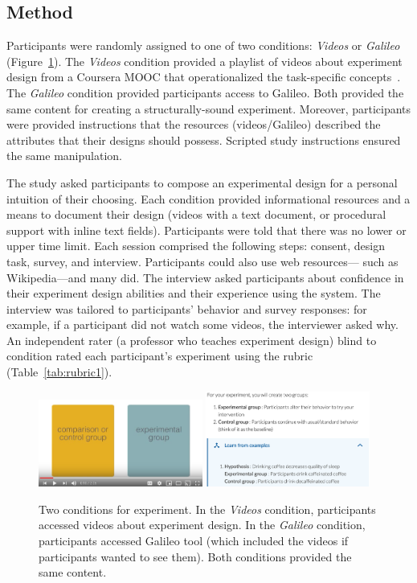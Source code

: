 \subsection*{Method}
Participants were randomly assigned to one of two conditions: \textit{Videos} or \textit{Galileo} (Figure~\ref{fig:galileo-6-study}). The \textit{Videos} condition provided a playlist of videos about experiment design from a Coursera MOOC that operationalized the task-specific concepts~\cite{Wobbrock2018}. The \textit{Galileo} condition provided participants access to Galileo. Both provided the same content for creating a structurally-sound experiment. Moreover, participants were provided instructions that the resources (videos/Galileo) described the attributes that their designs should possess. Scripted study instructions ensured the same manipulation. 

The study asked participants to compose an experimental design for a personal intuition of their choosing. Each condition provided informational resources and a means to document their design (videos with a text document, or procedural support with inline text fields). Participants were told that there was no lower or upper time limit. Each session comprised the following steps: consent, design task, survey, and interview. Participants could also use web resources--- such as Wikipedia---and many did. The interview asked participants about confidence in their experiment design abilities and their experience using the system. The interview was tailored to participants' behavior and survey responses: for example, if a participant did not watch some videos, the interviewer asked why. An independent rater (a professor who teaches experiment design) blind to condition rated each participant's experiment using the rubric (Table~\ref{tab:rubric1}).

\begin{figure}[t] 
  \centering
  \includegraphics[width=0.48\textwidth]{figures/galileo/galileo-study-1}
  \includegraphics[width=0.48\textwidth]{figures/galileo/galileo-study-2}
  \caption[Two conditions for experiment: \textit{Videos} and \textit{Galileo}]
{Two conditions for experiment. In the \textit{Videos} condition, participants accessed videos about experiment design. In the \textit{Galileo} condition, participants accessed Galileo tool (which included the videos if participants wanted to see them). Both conditions provided the same content. }
  \label{fig:galileo-6-study}
\end{figure}

